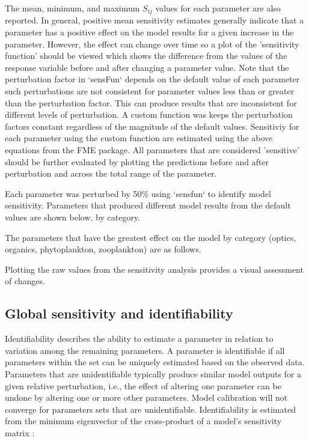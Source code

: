 \documentclass[letterpaper,12pt,oneside]{article}\usepackage[]{graphicx}\usepackage[]{color}
\begin{document}
The mean, minimum, and maximum $S_{ij}$ values for each parameter are also reported.  In general, positive mean sensitivity estimates generally indicate that a parameter has a positive effect on the model results for a given increase in the parameter.  However, the effect can change over time so a plot of the 'sensitivity function' should be viewed which shows the difference from the values of the response variable before and after changing a parameter value.  Note that the perturbation factor in `sensFun` depends on the default value of each parameter such perturbations are not consistent for parameter values less than or greater than the perturbation factor.  This can produce results that are inconsistent for different levels of perturbation.  A custom function was keeps the perturbation factors constant regardless of the magnitude of the default values.  Sensitiviy for each parameter using the custom function are estimated using the above equations from the FME package. All parameters that are considered 'sensitive' should be further evaluated by plotting the predictions before and after perturbation and across the total range of the parameter. 

Each parameter was perturbed by 50\% using `sensfun` to identify model sensitivity.  Parameters that produced different model results from the default values are shown below, by category. 

The parameters that have the greatest effect on the model by category (optics, organics, phytoplankton, zooplankton) are as follows.

Plotting the raw values from the sensitivity analysis provides a visual assessment of changes.

\subsection{Global sensitivity and identifiability}

Identifiability describes the ability to estimate a parameter in relation to variation among the remaining parameters.  A parameter is identifiable if all parameters within the set can be uniquely estimated based on the observed data.  Parameters that are unidentifiable typically produce similar model outputs for a given relative perturbation, i.e., the effect of altering one parameter can be undone by altering one or more other parameters.  Model calibration will not converge for parameters sets that are unidentifiable.  Identifiability is estimated from the minimum eigenvector of the cross-product of a model's sensitivity matrix \citep{Brun01,Omlin01}:
\end{document}
